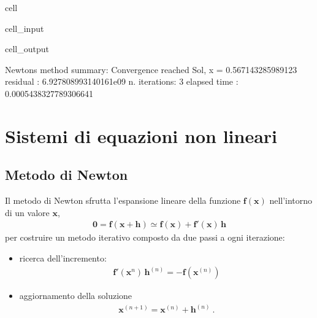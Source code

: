 \documentclass[letterpaper,10pt,italian]{jupyterBook}
\begin{document}
\begin{sphinxuseclass}{cell}
\begin{sphinxVerbatimInput}
\begin{sphinxuseclass}{cell_input}
\end{sphinxuseclass}\end{sphinxVerbatimInput}
\begin{sphinxVerbatimOutput}

\begin{sphinxuseclass}{cell_output}
\begin{sphinxVerbatim}[commandchars=\\\{\}]
Newton\PYGZsq{}s method summary: 
Convergence reached
Sol, x = \PYGZhy{}0.567143285989123
residual     : 6.927808993140161e\PYGZhy{}09
n. iterations: 3
elapsed time : 0.0005438327789306641
\end{sphinxVerbatim}

\end{sphinxuseclass}\end{sphinxVerbatimOutput}

\end{sphinxuseclass}

\section{Sistemi di equazioni non lineari}
\label{\detokenize{ch/numerics/nonlinear:sistemi-di-equazioni-non-lineari}}

\subsection{Metodo di Newton}
\label{\detokenize{ch/numerics/nonlinear:id1}}
\sphinxAtStartPar
Il metodo di Newton sfrutta l’espansione lineare della funzione \(\mathbf{f}(\mathbf{x})\) nell’intorno di un valore \(\mathbf{x}\),
\begin{equation*}
\begin{split}\mathbf{0} = \mathbf{f}(\mathbf{x} + \mathbf{h}) \simeq \mathbf{f}(\mathbf{x}) + \mathbf{f}'(\mathbf{x}) \, \mathbf{h}\end{split}
\end{equation*}
\sphinxAtStartPar
per costruire un metodo iterativo composto da due passi a ogni iterazione:
\begin{itemize}
\item {} 
\sphinxAtStartPar
ricerca dell’incremento:
\begin{equation*}
\begin{split}\mathbf{f}'(\mathbf{x}^{n}) \, \mathbf{h}^{(n)} = - \mathbf{f}(\mathbf{x}^{(n)})\end{split}
\end{equation*}
\item {} 
\sphinxAtStartPar
aggiornamento della soluzione
\begin{equation*}
\begin{split}\mathbf{x}^{(n+1)} = \mathbf{x}^{(n)} + \mathbf{h}^{(n)} \ .\end{split}
\end{equation*}
\end{itemize}
\end{document}
